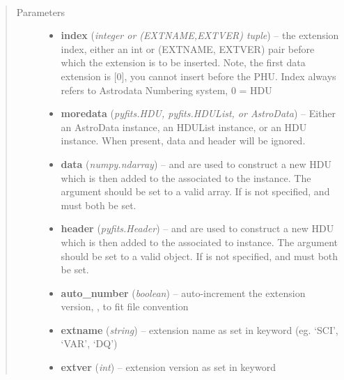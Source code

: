 \documentclass[letterpaper,10pt,english]{sphinxmanual}
\begin{document}
\begin{fulllineitems}
\label{chapter_AstroDataClass:astrodata.data.AstroData.insert}~\begin{quote}\begin{description}
\item[{Parameters}] \leavevmode\begin{itemize}
\item {} 
\textbf{index} (\emph{integer or (EXTNAME,EXTVER) tuple}) -- the extension index, either an int or (EXTNAME, EXTVER)
pair before which the extension is to be inserted. Note, the 
first data extension is {[}0{]}, you cannot insert before the PHU.
Index always refers to Astrodata Numbering system, 0 = HDU

\item {} 
\textbf{moredata} (\emph{pyfits.HDU, pyfits.HDUList, or AstroData}) -- Either an AstroData instance, an HDUList instance, or
an HDU instance. When present, data and header will be ignored.

\item {} 
\textbf{data} (\emph{numpy.ndarray}) --  and  are used to construct a new HDU which is then 
added to the  associated to the  instance. The  
argument should be set
to a valid  array. If  is not specified,  and 
must both be set.

\item {} 
\textbf{header} (\emph{pyfits.Header}) --  and  are used
to construct a new HDU which is then added to the  associated to 
 instance. The  argument should be set to a
valid  object. If  is not specified,  and
 must both be set.

\item {} 
\textbf{auto\_number} (\emph{boolean}) -- auto-increment the extension version, , to fit file convention

\item {} 
\textbf{extname} (\emph{string}) -- extension name as set in keyword  (eg. `SCI', `VAR', `DQ')

\item {} 
\textbf{extver} (\emph{int}) -- extension version as set in keyword 


\end{itemize}
\end{description}
\end{quote}
\end{fulllineitems}
\end{document}
